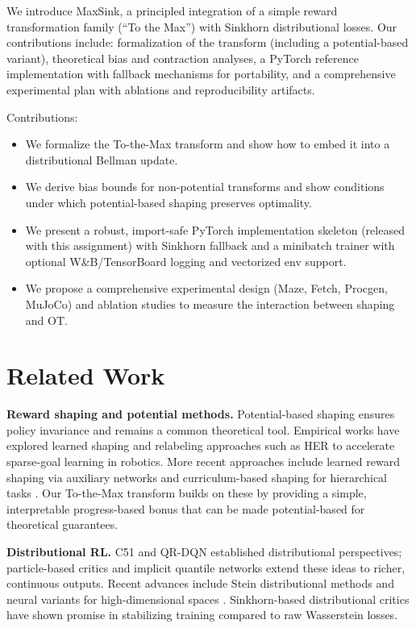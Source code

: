 \documentclass[10pt,twocolumn]{article}
\begin{document}
We introduce MaxSink, a principled integration of a simple reward transformation family (``To the Max'') with Sinkhorn distributional losses. Our contributions include: formalization of the transform (including a potential-based variant), theoretical bias and contraction analyses, a PyTorch reference implementation with fallback mechanisms for portability, and a comprehensive experimental plan with ablations and reproducibility artifacts.

Contributions:
\begin{itemize}
  \item We formalize the To-the-Max transform and show how to embed it into a distributional Bellman update.
  \item We derive bias bounds for non-potential transforms and show conditions under which potential-based shaping preserves optimality.
  \item We present a robust, import-safe PyTorch implementation skeleton (released with this assignment) with Sinkhorn fallback and a minibatch trainer with optional W\&B/TensorBoard logging and vectorized env support.
  \item We propose a comprehensive experimental design (Maze, Fetch, Procgen, MuJoCo) and ablation studies to measure the interaction between shaping and OT.
\end{itemize}

\section{Related Work}
\textbf{Reward shaping and potential methods.} Potential-based shaping \cite{ng1999policy} ensures policy invariance and remains a common theoretical tool. Empirical works have explored learned shaping and relabeling approaches such as HER \cite{andrychowicz2017hindsight} to accelerate sparse-goal learning in robotics. More recent approaches include learned reward shaping via auxiliary networks \cite{harutyunyan2019hindsight} and curriculum-based shaping for hierarchical tasks \cite{florensa2017reverse}. Our To-the-Max transform builds on these by providing a simple, interpretable progress-based bonus that can be made potential-based for theoretical guarantees.

\textbf{Distributional RL.} C51 \cite{bellemare2017distributional} and QR-DQN \cite{dabney2018distributional} established distributional perspectives; particle-based critics and implicit quantile networks extend these ideas to richer, continuous outputs. Recent advances include Stein distributional methods \cite{rowland2019stein} and neural variants for high-dimensional spaces \cite{yang2019fully}. Sinkhorn-based distributional critics \cite{abdullah2020wasserstein} have shown promise in stabilizing training compared to raw Wasserstein losses.
\end{document}
